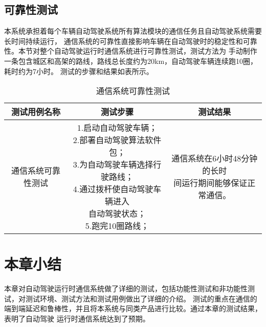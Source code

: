\subsection{可靠性测试}
本系统承担着每个车辆自动驾驶系统所有算法模块的通信任务且自动驾驶系统需要长时间持续运行，
通信系统的可靠性直接影响车辆在自动驾驶时的稳定性和可靠性。本节对整个自动驾驶运行时通信系统进行可靠性测试，测试方法为
手动制作一条包含城区和高架的路线，路线总长度约为20km，自动驾驶车辆连续跑10圈，耗时约为7小时。
测试的步骤和结果如表所示。

\begin{table}[H]
  \centering\small
  \caption{通信系统可靠性测试}
  \renewcommand\arraystretch{1.2}
  \label{master_robust}
  \begin{tabular}{ccc}
    \toprule
    测试用例名称 & 测试步骤 & 测试结果 \\
    \midrule
    通信系统可靠性测试 & \makecell[l]{1.启动自动驾驶车辆；\\2.部署自动驾驶算法软件包；\\3.为自动驾驶车辆选择行驶路线；\\4.通过拨杆使自动驾驶车辆进入\\自动驾驶状态；\\5.跑完10圈路线；} & \makecell[l]{通信系统在6小时48分钟的长时\\间运行期间能够保证正常通信。\\}\\
    \bottomrule
  \end{tabular}
\end{table}

\section{本章小结}
本章对自动驾驶运行时通信系统做了详细的测试，包括功能性测试和非功能性测试，对测试环境、测试方法和测试用例做出了详细的介绍。
测试的重点在通信的端到端延迟和鲁棒性，并且将本系统与同类产品进行比较。通过本章的测试结果，表明了自动驾驶
运行时通信系统达到了预期。
